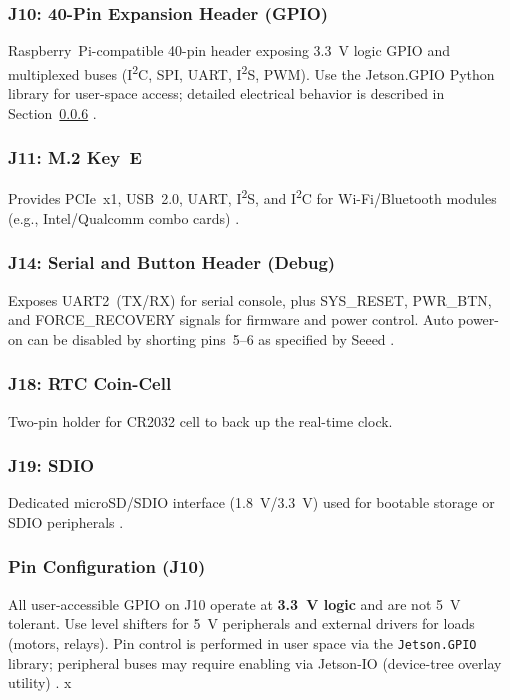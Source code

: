 \subsubsection{J10: 40-Pin Expansion Header (\ac{GPIO})}
Raspberry~Pi-compatible 40-pin header exposing 3.3~V logic \ac{GPIO} and multiplexed buses (I\textsuperscript{2}C, \ac{SPI}, \ac{UART}, I\textsuperscript{2}S, \ac{PWM}). 
Use the Jetson.\ac{GPIO} Python library for user-space access; detailed electrical behavior is described in Section~\ref{subsec:pinconfig} \cite{reComputer_Jetson_GPIO}.



\subsubsection{J11: M.2 Key~E}
Provides PCIe~x1, \ac{USB}~2.0, UART, I\textsuperscript{2}S, and I\textsuperscript{2}C for Wi-Fi/Bluetooth modules (e.g., Intel/Qualcomm combo cards) \cite{seeedJ101Manual}.

\subsubsection{J14: Serial and Button Header (Debug)}
Exposes UART2~(TX/RX) for serial console, plus SYS\_RESET, PWR\_BTN, and FORCE\_RECOVERY signals for firmware and power control. 
Auto power-on can be disabled by shorting pins~5--6 as specified by Seeed \cite{seeedJ101Manual}.

\subsubsection{J18: RTC Coin-Cell}
Two-pin holder for CR2032 cell to back up the real-time clock.

\subsubsection{J19: SDIO}
Dedicated microSD/SDIO interface (1.8~V/3.3~V) used for bootable storage or SDIO peripherals \cite{seeedJ101Manual}.



\subsubsection{Pin Configuration (J10)}
\label{subsec:pinconfig}
All user-accessible \ac{GPIO} on J10 operate at \textbf{3.3~V logic} and are not 5~V tolerant. 
Use level shifters for 5~V peripherals and external drivers for loads (motors, relays). 
Pin control is performed in user space via the \texttt{Jetson.GPIO} library; peripheral buses may require enabling via Jetson-IO (device-tree overlay utility) \cite{reComputer_Jetson_GPIO,seeedJ101Manual}.
x

